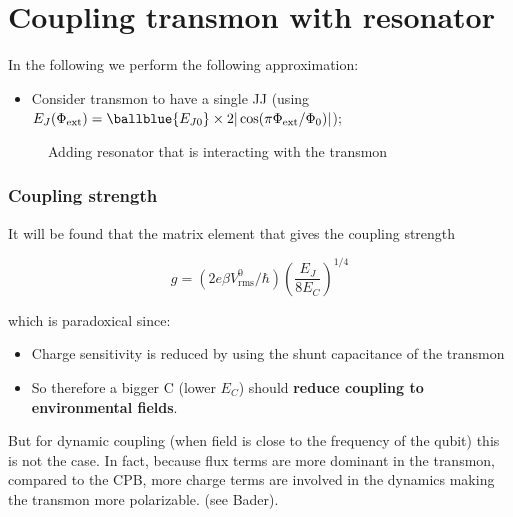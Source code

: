 \section{Coupling transmon with resonator}

In the following we perform the following approximation:
\begin{itemize}
\item          Consider          transmon         to          have          a          single         JJ          (using
  $E_J(\Phi_{\text{ext}}) = \ballblue{E_{J0}} \times 2|\cos(\pi\Phi_\text{ext}/\Phi_0)|$);
\end{itemize}

\begin{figure}[h]
  \centering {}
  \caption{\small Adding resonator that is interacting with the transmon\label{fig:cooper_pair_box_6_cqed}}
\end{figure}

\subsubsection{Coupling strength}
\label{sec:coupling-strength}


It will be found that the matrix element that gives the coupling strength

\begin{equation}
  g = \left( 2e\beta V_{\text{rms}}^0/\hbar \right)\left( \frac{E_{J}}{8E_{C}} \right)^{1/4}
\end{equation}

\noindent which is paradoxical since:
\begin{itemize}
\item Charge sensitivity is reduced by using the shunt capacitance of the transmon
\item So therefore a bigger C (lower $E_C$) should \textbf{reduce coupling to environmental fields}.
\end{itemize}

\begin{framed}\noindent

  But for dynamic coupling (when field  is close to the frequency of the qubit) this is  not the case.  In fact, because
  flux terms  are more dominant in  the transmon, compared to  the CPB, more charge  terms are involved in  the dynamics
  making the transmon more polarizable. (see Bader).
\end{framed}



\newpage

